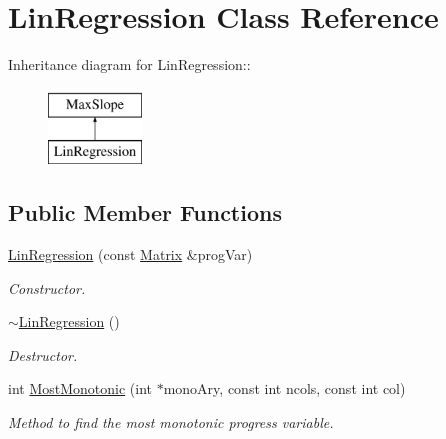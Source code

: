 \hypertarget{classLinRegression}{
\section{LinRegression Class Reference}
\label{de/d89/classLinRegression}
}
Inheritance diagram for LinRegression::\begin{figure}[H]
\begin{center}
\leavevmode
\includegraphics[height=2cm]{de/d89/classLinRegression}
\end{center}
\end{figure}
\subsection*{Public Member Functions}
\begin{DoxyCompactItemize}
\item 
\hyperlink{classLinRegression_a0d747e38f7a8997765be15f43062290c}{LinRegression} (const \hyperlink{classMatrix}{Matrix} \&progVar)
\begin{DoxyCompactList}\small\item\em Constructor. \item\end{DoxyCompactList}\item 
\hypertarget{classLinRegression_a4ea5ffb8032172bdf54d1f2d4041d520}{
\hyperlink{classLinRegression_a4ea5ffb8032172bdf54d1f2d4041d520}{$\sim$LinRegression} ()}
\label{de/d89/classLinRegression_a4ea5ffb8032172bdf54d1f2d4041d520}

\begin{DoxyCompactList}\small\item\em Destructor. \item\end{DoxyCompactList}\item 
int \hyperlink{classLinRegression_a1f245c4e47637f3f1d94f6129861406d}{MostMonotonic} (int $\ast$monoAry, const int ncols, const int col)
\begin{DoxyCompactList}\small\item\em Method to find the most monotonic progress variable. \item\end{DoxyCompactList}\end{DoxyCompactItemize}


